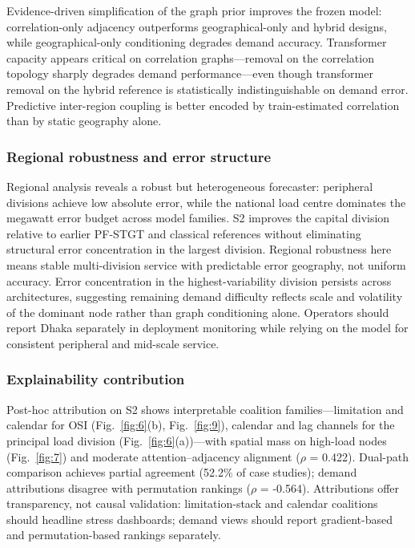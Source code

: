 Evidence-driven simplification of the graph prior improves the frozen model: correlation-only adjacency outperforms geographical-only and hybrid designs, while geographical-only conditioning degrades demand accuracy. Transformer capacity appears critical on correlation graphs---removal on the correlation topology sharply degrades demand performance---even though transformer removal on the hybrid reference is statistically indistinguishable on demand error. Predictive inter-region coupling is better encoded by train-estimated correlation than by static geography alone.

\subsubsection{Regional robustness and error structure}\label{subsubsection:regional_robustness_and_error_structure}

Regional analysis reveals a robust but heterogeneous forecaster: peripheral divisions achieve low absolute error, while the national load centre dominates the megawatt error budget across model families. S2 improves the capital division relative to earlier PF-STGT and classical references without eliminating structural error concentration in the largest division. Regional robustness here means stable multi-division service with predictable error geography, not uniform accuracy. Error concentration in the highest-variability division persists across architectures, suggesting remaining demand difficulty reflects scale and volatility of the dominant node rather than graph conditioning alone. Operators should report Dhaka separately in deployment monitoring while relying on the model for consistent peripheral and mid-scale service.

\subsubsection{Explainability contribution}\label{subsubsection:explainability_contribution}

Post-hoc attribution on S2 shows interpretable coalition families---limitation and calendar for OSI (Fig.~\ref{fig:6}(b), Fig.~\ref{fig:9}), calendar and lag channels for the principal load division (Fig.~\ref{fig:6}(a))---with spatial mass on high-load nodes (Fig.~\ref{fig:7}) and moderate attention--adjacency alignment ($\rho$ = 0.422). Dual-path comparison achieves partial agreement (52.2\% of case studies); demand attributions disagree with permutation rankings ($\rho$ = -0.564). Attributions offer transparency, not causal validation: limitation-stack and calendar coalitions should headline stress dashboards; demand views should report gradient-based and permutation-based rankings separately.

